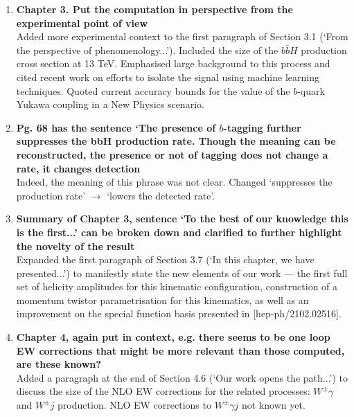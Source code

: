 \documentclass[main.tex]{subfiles}
\begin{document}
\begin{enumerate}
    \item \textbf{Chapter 3. Put the computation in perspective from the experimental point of view} \\
    Added more experimental context to the first paragraph of Section 3.1 (`From the perspective of phenomenology...'). Included the size of the $b\bar{b}H$ production cross section at 13 TeV. Emphasised large background to this process and cited recent work on efforts to isolate the signal using machine learning techniques. Quoted current accuracy bounds for the value of the $b$-quark Yukawa coupling in a New Physics scenario. 
    
    \item \textbf{Pg. 68 has the sentence `The presence of $b$-tagging further suppresses the bbH
production rate. Though the meaning can be reconstructed, the presence or not of
tagging does not change a rate, it changes detection} \\
Indeed, the meaning of this phrase was not clear. Changed `suppresses the production rate' $\rightarrow$ `lowers the detected rate'.

    \item \textbf{Summary of Chapter 3, sentence `To the best of our knowledge this is the first...' can be broken down and clarified to further highlight the novelty of the result}
\\
Expanded the first paragraph of Section 3.7 (`In this chapter, we have presented...') to manifestly state the new elements of our work --- the first full set of helicity amplitudes for this kinematic configuration, construction of a momentum twistor parametrisation for this kinematics, as well as an improvement on the special function basis presented in [hep-ph/2102.02516].

    \item \textbf{Chapter 4, again put in context, e.g. there seems to be one loop EW corrections that might be more relevant than those computed, are these known?} \\
Added a paragraph at the end of Section 4.6 (`Our work opens the path...') to discuss the size of the NLO EW corrections for the related processes: $W^\pm \gamma$ and $W^\pm j$ production. NLO EW corrections to $W^\pm \gamma j$ not known yet.


\end{enumerate}
\end{document}
